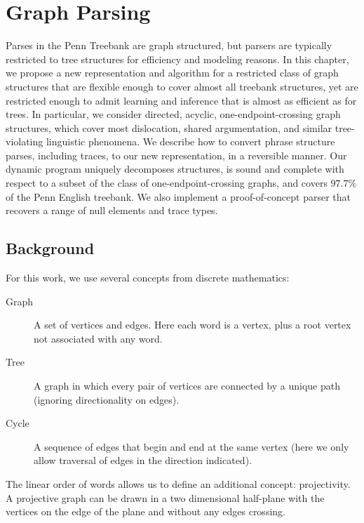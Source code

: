 \chapter{Graph Parsing} \label{chp:parsing}


Parses in the Penn Treebank \parencite{ptb} are graph structured, but parsers are typically restricted to tree structures for efficiency and modeling reasons.
In this chapter, we propose a new representation and algorithm for a restricted class of graph structures that are flexible enough to cover almost all treebank structures, yet are restricted enough to admit learning and inference that is almost as efficient as for trees.
In particular, we consider directed, acyclic, one-endpoint-crossing graph structures, which cover most dislocation, shared argumentation, and similar tree-violating linguistic phenomena.
We describe how to convert phrase structure parses, including traces, to our new representation, in a reversible manner.
Our dynamic program uniquely decomposes structures, is sound and complete with respect to a subset of the class of one-endpoint-crossing graphs, and covers $97.7\%$ of the Penn English treebank.
We also implement a proof-of-concept parser that recovers a range of null elements and trace types.

\section{Background}

For this work, we use several concepts from discrete mathematics:

\begin{description}
  \item[Graph] A set of vertices and edges.
  Here each word is a vertex, plus a root vertex not associated with any word.
  \item[Tree] A graph in which every pair of vertices are connected by a unique path (ignoring directionality on edges).
  \item[Cycle] A sequence of edges that begin and end at the same vertex (here we only allow traversal of edges in the direction indicated).
\end{description}

The linear order of words allows us to define an additional concept: projectivity.
A projective graph can be drawn in a two dimensional half-plane with the vertices on the edge of the plane and without any edges crossing.

